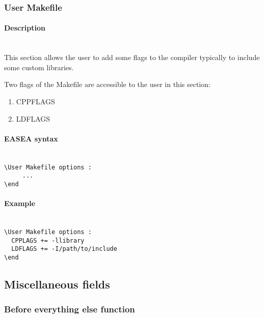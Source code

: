 \documentclass{book}
\begin{document}
\subsubsection{User Makefile}\label{user-makefile}

\paragraph{Description}\label{description-3}
~\\

This section allows the user to add some flags to the compiler typically
to include some custom libraries.

Two flags of the Makefile are accessible to the user in this section:

\begin{enumerate}
\itemsep1pt\parskip0pt
\item
  CPPFLAGS
\item
  LDFLAGS
\end{enumerate}

\paragraph{EASEA syntax}\label{easea-syntax-3}
~\\

\texttt{\textbackslash{}User~Makefile~options~:}\\\texttt{~~~~~...}\\\texttt{\textbackslash{}end}

\paragraph{Example}\label{example-3}
~\\

\texttt{\textbackslash{}User~Makefile~options~:}\\\texttt{~~CPPLAGS~+=~-llibrary}\\\texttt{~~LDFLAGS~+=~-I/path/to/include}\\\texttt{\textbackslash{}end}

\subsection{Miscellaneous fields}\label{miscellaneous-fields}

\subsubsection{Before everything else
function}\label{before-everything-else-function}
\end{document}

